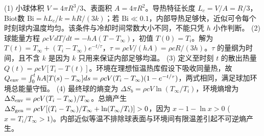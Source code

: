 (1) 小球体积 \(V=4\pi R^3/3\)、表面积 \(A=4\pi R^2\)。导热特征长度 \(L_c=V/A=R/3\)，Biot数 \(\mathrm{Bi}=hL_c/k=hR/(3k)\)；若 \(\mathrm{Bi}\ll0.1\)，内部导热足够快，近似可令每个时刻球内温度均匀。该条件与冷却时间常数大小不同，不能只凭 \(h\) 小作判断。
(2) 球能量方程 \(\rho cV\,dT/dt=-hA(T-T_\infty)\)，初值 \(T(0)=T_i\)。解为 \(T(t)=T_\infty+(T_i-T_\infty)e^{-t/\tau}\)，\(\tau=\rho cV/(hA)=\rho cR/(3h)\)。\(\tau\) 的量纲为时间，且不含 \(k\) 是因为 \(k\) 只用来保证内部足够均温。
(3) 定义至时刻 \(t\) 的散出热量 \(Q(t)=\rho cV[T_i-T(t)]\)。环境在理想恒温热库假设下吸收同量热，故 \(Q_{\rm env}=\int_0^t hA[T(s)-T_\infty]ds=\rho cV(T_i-T_\infty)(1-e^{-t/\tau})\)，两式相同，满足球加环境总能量守恒。
(4) 最终球的熵变为 \(\Delta S_b=\rho cV\ln(T_\infty/T_i)\)，环境熵增为 \(\Delta S_{\rm env}=\rho cV(T_i-T_\infty)/T_\infty\)。总熵产生 \(\Delta S_{\rm gen}=\rho cV[(T_i-T_\infty)/T_\infty+\ln(T_\infty/T_i)]>0\)，因为 \(x-1-\ln x>0\) (\(x=T_i/T_\infty>1\))。内部近似等温不排除球表面与环境间有限温差引起不可逆熵产生。
